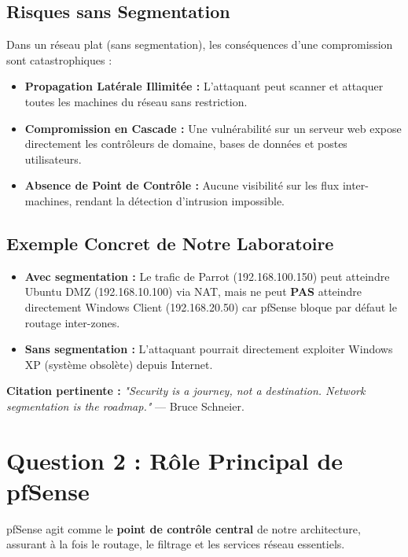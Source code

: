 \documentclass[12pt,a4paper,openany]{report}
\begin{document}
	\subsection{Risques sans Segmentation}
	Dans un réseau plat (sans segmentation), les conséquences d'une compromission sont catastrophiques :
	
	\begin{itemize}
		\item \textbf{Propagation Latérale Illimitée :} L'attaquant peut scanner et attaquer toutes les machines du réseau sans restriction.
		\item \textbf{Compromission en Cascade :} Une vulnérabilité sur un serveur web expose directement les contrôleurs de domaine, bases de données et postes utilisateurs.
		\item \textbf{Absence de Point de Contrôle :} Aucune visibilité sur les flux inter-machines, rendant la détection d'intrusion impossible.
	\end{itemize}
	
	\subsection{Exemple Concret de Notre Laboratoire}
	\begin{itemize}
		\item \textbf{Avec segmentation :} Le trafic de Parrot (192.168.100.150) peut atteindre Ubuntu DMZ (192.168.10.100) via NAT, mais ne peut \textbf{PAS} atteindre directement Windows Client (192.168.20.50) car pfSense bloque par défaut le routage inter-zones.
		\item \textbf{Sans segmentation :} L'attaquant pourrait directement exploiter Windows XP (système obsolète) depuis Internet.
	\end{itemize}
	
	\textbf{Citation pertinente :} \textit{"Security is a journey, not a destination. Network segmentation is the roadmap."} --- Bruce Schneier.
	
	\section{Question 2 : Rôle Principal de pfSense}
	
	pfSense agit comme le \textbf{point de contrôle central} de notre architecture, assurant à la fois le routage, le filtrage et les services réseau essentiels.
	
\end{document}

